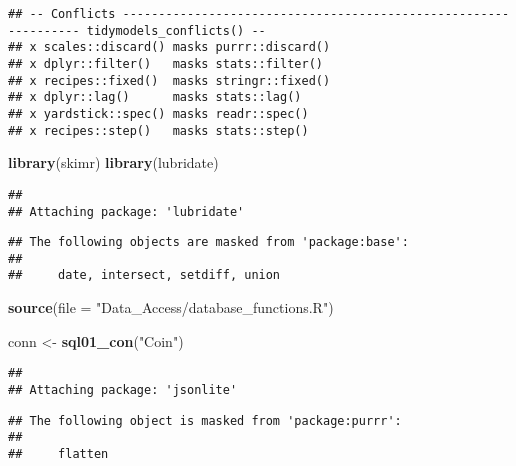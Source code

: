 \documentclass[]{article}
\newenvironment{Shaded}{\begin{snugshade}}{\end{snugshade}}
\newcommand{\KeywordTok}[1]{\textcolor[rgb]{0.13,0.29,0.53}{\textbf{#1}}}
\newcommand{\DataTypeTok}[1]{\textcolor[rgb]{0.13,0.29,0.53}{#1}}
\newcommand{\StringTok}[1]{\textcolor[rgb]{0.31,0.60,0.02}{#1}}
\newcommand{\OperatorTok}[1]{\textcolor[rgb]{0.81,0.36,0.00}{\textbf{#1}}}
\newcommand{\NormalTok}[1]{#1}
\begin{document}
\begin{verbatim}
## -- Conflicts ---------------------------------------------------------------- tidymodels_conflicts() --
## x scales::discard() masks purrr::discard()
## x dplyr::filter()   masks stats::filter()
## x recipes::fixed()  masks stringr::fixed()
## x dplyr::lag()      masks stats::lag()
## x yardstick::spec() masks readr::spec()
## x recipes::step()   masks stats::step()
\end{verbatim}

\begin{Shaded}
\begin{Highlighting}[]
\KeywordTok{library}\NormalTok{(skimr)}
\KeywordTok{library}\NormalTok{(lubridate)}
\end{Highlighting}
\end{Shaded}

\begin{verbatim}
## 
## Attaching package: 'lubridate'
\end{verbatim}

\begin{verbatim}
## The following objects are masked from 'package:base':
## 
##     date, intersect, setdiff, union
\end{verbatim}

\begin{Shaded}
\begin{Highlighting}[]
\KeywordTok{source}\NormalTok{(}\DataTypeTok{file =} \StringTok{"Data_Access/database_functions.R"}\NormalTok{)}

\NormalTok{conn <-}\StringTok{ }\KeywordTok{sql01_con}\NormalTok{(}\StringTok{"Coin"}\NormalTok{)}
\end{Highlighting}
\end{Shaded}

\begin{verbatim}
## 
## Attaching package: 'jsonlite'
\end{verbatim}

\begin{verbatim}
## The following object is masked from 'package:purrr':
## 
##     flatten
\end{verbatim}

\begin{Shaded}
\end{Shaded}
\end{document}
